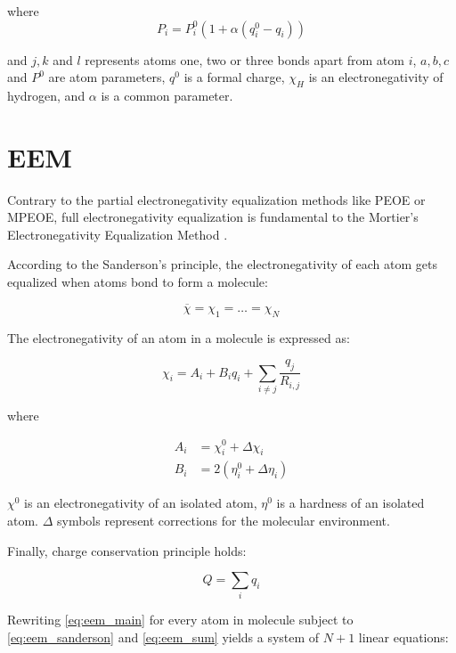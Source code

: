 \documentclass[oneside]{memoir}
\newcommand\ddfrac[2]{\frac{\displaystyle #1}{\displaystyle #2}}
\begin{document}
where
\begin{equation}
\label{eq:charge2_aux}
P_i = P_i^0\left(1 + \alpha(q_i^0 - q_i)\right)
\end{equation}

and $j, k$ and $l$ represents atoms one, two or three bonds apart from atom $i$, $a, b, c$ and $P^0$ are atom parameters, $q^0$ is a formal charge, $\chi_H$ is an electronegativity of hydrogen, and $\alpha$ is a common parameter.

\section*{EEM}
\label{sec:methods_eem}
Contrary to the partial electronegativity equalization methods like PEOE or MPEOE, full electronegativity equalization is fundamental to the Mortier's Electronegativity Equalization Method \cite{Mortier1986}.

According to the Sanderson's principle, the electronegativity of each atom gets equalized when atoms bond to form a molecule:

\begin{equation}
\label{eq:eem_sanderson}
\overline{\chi} = \chi_1 = \ldots = \chi_N
\end{equation}

The electronegativity of an atom in a molecule is expressed as:

\begin{equation}
\label{eq:eem_main}
\chi_i = A_i + B_iq_i + \sum_{i \neq j} \ddfrac{q_j}{R_{i, j}}
\end{equation}

where

\begin{align}
A_i &= \chi_i^0 + \Delta\chi_i\\
B_i &= 2(\eta_i^0 + \Delta\eta_i)
\end{align}

$\chi^0$ is an electronegativity of an isolated atom, $\eta^0$ is a hardness of an isolated atom. $\Delta$ symbols represent corrections for the molecular environment.

Finally, charge conservation principle holds:

\begin{equation}
\label{eq:eem_sum}
Q = \sum_i q_i
\end{equation}

Rewriting \ref{eq:eem_main} for every atom in molecule subject to \ref{eq:eem_sanderson} and \ref{eq:eem_sum} yields a system of $N + 1$ linear equations:
\end{document}
